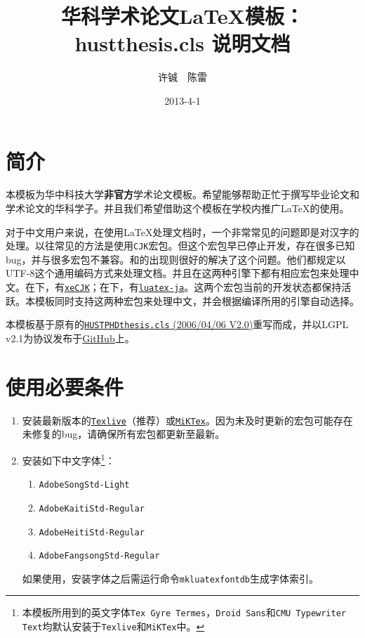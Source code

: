 \documentclass[12pt,a4paper,numbered,full]{l3doc}
\begin{document}
\title{华科学术论文\LaTeX{}模板：hustthesis.cls 说明文档}
\author{许铖~~陈雷}
\date{2013-4-1}

\maketitle

\tableofcontents

\section{简介}

本模板为华中科技大学\textbf{非官方}学术论文模板。希望能够帮助正忙于撰写毕业论文和学术论文的华科学子。并且我们希望借助这个模板在学校内推广\LaTeX{}的使用。

对于中文用户来说，在使用\LaTeX{}处理文档时，一个非常常见的问题即是对汉字的处理。以往常见的方法是使用\verb+CJK+宏包。但这个宏包早已停止开发，存在很多已知bug，并与很多宏包不兼容。\XeTeX{}和\LuaTeX{}的出现则很好的解决了这个问题。他们都规定以UTF-8这个通用编码方式来处理文档。并且在这两种引擎下都有相应宏包来处理中文。在\XeLaTeX{}下，有\href{http://mirrors.ctan.org/help/Catalogue/entries/xecjk.html}{\texttt{xeCJK}}；在\LuaLaTeX{}下，有\href{http://mirrors.ctan.org/help/Catalogue/entries/luatexja.html}{\texttt{luatex-ja}}。这两个宏包当前的开发状态都保持活跃。本模板同时支持这两种宏包来处理中文，并会根据编译所用的引擎自动选择。

本模板基于原有的\href{http://sourceforge.net/projects/hustthesis}{\texttt{HUSTPHDthesis.cls}  (2006/04/06 V2.0)}重写而成，并以LGPL v2.1为协议发布于\href{https://github.com/michael911009/HUSTThesis}{GitHub}上。

\section{使用必要条件}

\begin{enumerate}
    \item 安装最新版本的\href{http://www.tug.org/texlive/}{\texttt{Texlive}}（推荐）或\href{http://miktex.org/}{\texttt{MiKTex}}。因为未及时更新的宏包可能存在未修复的bug，请确保所有宏包都更新至最新。
    \item 安装如下中文字体\footnote{本模板所用到的英文字体\texttt{Tex Gyre Termes}，\texttt{Droid Sans}和\texttt{CMU Typewriter Text}均默认安装于\texttt{Texlive}和\texttt{MiKTex}中。}：
    \begin{enumerate}[label=\emph{\alph*})]
        \item \verb+AdobeSongStd-Light+
        \item \verb+AdobeKaitiStd-Regular+
        \item \verb+AdobeHeitiStd-Regular+
        \item \verb+AdobeFangsongStd-Regular+
    \end{enumerate}
    \begin{informationnote}
    如果使用\textnormal{\LuaTeX}，安装字体之后需运行命令\verb+mkluatexfontdb+生成字体索引。
    \end{informationnote}
\end{enumerate}
\end{document}
